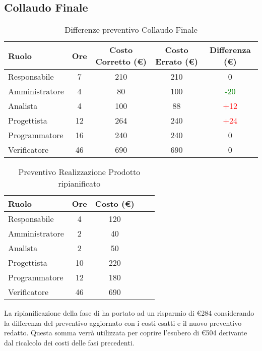 \subsection{Collaudo Finale}
\begin{table}[h]
\begin{center}
\begin{tabular}{|l|c|c|c|c|}
\hline Ruolo & Ore & Costo Corretto (\euro) & Costo Errato (\euro) & Differenza (\euro) \\
\hline
Responsabile & 7 & 210  & 210 & 0\\
Amministratore & 4 & 80 & 100 & \textcolor{Green}{-20}\\
Analista & 4 & 100 & 88 & \textcolor{red}{+12}\\
Progettista & 12 & 264 & 240 & \textcolor{red}{+24}\\
Programmatore & 16 & 240 & 240 & 0\\
Verificatore & 46 & 690 & 690 & 0\\
\hline
\end{tabular}
\caption{Differenze preventivo Collaudo Finale}
\end{center}
\end{table}
\FloatBarrier
\begin{table}[h]
\begin{center}
\begin{tabular}{|l|c|c|c|c|}
\hline Ruolo & Ore & Costo (\euro) \\
\hline
Responsabile & 4 & 120 \\
Amministratore & 2 & 40 \\
Analista & 2 & 50 \\
Progettista & 10 & 220\\
Programmatore & 12 & 180\\
Verificatore & 46 & 690\\
\hline
\end{tabular}
\caption{Preventivo Realizzazione Prodotto ripianificato}
\end{center}
\end{table}
\FloatBarrier
La ripianificazione della fase di \fVV ha portato ad un risparmio di \euro284 considerando la differenza del preventivo aggiornato con i costi esatti e il nuovo preventivo redatto.
Questa somma verrà utilizzata per coprire l'esubero di \euro504 derivante dal ricalcolo dei costi delle fasi precedenti.
